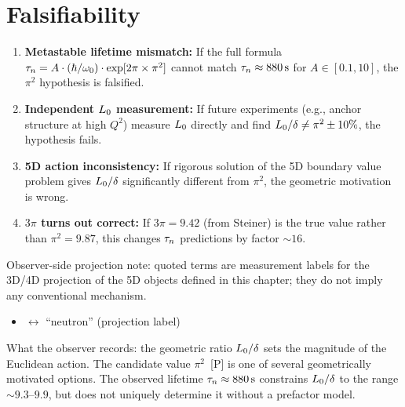 \section{Falsifiability}
\label{sec:L0delta:falsify}

\begin{edcopenbox}[title=Falsifiability Hooks]
    \begin{enumerate}
        \item \textbf{Metastable lifetime mismatch:} If the full formula
              $\tau_n = A \cdot (\hbar/\omega_0) \cdot \exp[2\pi \times \pi^2]$
              cannot match $\tau_n \approx 880\,\mathrm{s}$ for $A \in [0.1, 10]$,
              the $\pi^2$ hypothesis is falsified.

        \item \textbf{Independent $L_0$ measurement:} If future experiments
              (e.g., anchor structure at high $Q^2$) measure $L_0$ directly
              and find $L_0/\delta \neq \pi^2 \pm 10\%$, the hypothesis fails.

        \item \textbf{5D action inconsistency:} If rigorous solution of the 5D
              boundary value problem gives $L_0/\delta$ significantly
              different from $\pi^2$, the geometric motivation is wrong.

        \item \textbf{$3\pi$ turns out correct:} If $3\pi = 9.42$ (from Steiner)
              is the true value rather than $\pi^2 = 9.87$, this changes
              $\tau_n$ predictions by factor $\sim 16$.
    \end{enumerate}
\end{edcopenbox}


\begin{observerbox}
Observer-side projection note: quoted terms are measurement labels for the
3D/4D projection of the 5D objects defined in this chapter; they do not
imply any conventional mechanism.

\begin{itemize}
    \item \MetastableJunction{} $\leftrightarrow$ ``neutron'' (projection label)
\end{itemize}

What the observer records: the geometric ratio $L_0/\delta$
sets the magnitude of the Euclidean action. The candidate value $\pi^2$~[P]
is one of several geometrically motivated options. The observed lifetime
$\tau_n \approx 880\,\mathrm{s}$ constrains $L_0/\delta$ to the range
$\sim 9.3$--$9.9$, but does not uniquely determine it without a prefactor model.
\end{observerbox}


